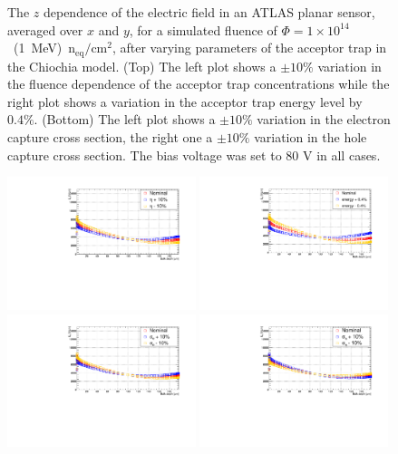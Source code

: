 \begin{figure}[htpb!]
\caption{The $z$ dependence of the electric field in an ATLAS planar sensor, averaged over $x$ and $y$, for a simulated
  fluence of $\Phi=1\times10^{14}$~(1~MeV)~n$_\text{eq}/\text{cm}^{2}$, after varying parameters of the acceptor trap in the Chiochia model. (Top) The left plot shows a $\pm 10\%$ variation in the fluence dependence of the acceptor trap concentrations while the right plot shows a variation in the acceptor trap energy level by $0.4\%$. 
  (Bottom) The left plot shows a $\pm 10\%$ variation in the electron capture cross section, the right one a $\pm 10\%$ variation in the hole capture cross section.
The bias voltage was set to $80$ V in all cases.}
\label{fig:acc_electricfieldvariations}
\end{figure}


\begin{figure}[htpb!]
\centering
\includegraphics[width=0.49\textwidth]{new_Detavariation.pdf}
\includegraphics[width=0.49\textwidth]{new_Denergyvariation.pdf}
\includegraphics[width=0.49\textwidth]{new_Dsigmaevariation.pdf}
\includegraphics[width=0.49\textwidth]{new_Dsigmahvariation.pdf}

\end{figure}
